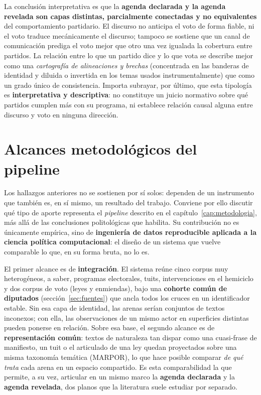 La conclusión interpretativa es que la \textbf{agenda declarada y la agenda
revelada son capas distintas, parcialmente conectadas y no equivalentes} del
comportamiento partidario. El discurso no anticipa el voto de forma fiable, ni el
voto traduce mecánicamente el discurso; tampoco se sostiene que un canal de
comunicación prediga el voto mejor que otro una vez igualada la cobertura entre
partidos. La relación entre lo que un partido dice y lo que vota se describe mejor
como una \emph{cartografía de alineaciones y brechas} (concentrada en las
banderas de identidad y diluida o invertida en los temas usados
instrumentalmente) que como un grado único de consistencia. Importa subrayar,
por último, que esta tipología es \textbf{interpretativa y descriptiva}: no
constituye un juicio normativo sobre qué partidos cumplen más con su programa, ni
establece relación causal alguna entre discurso y voto en ninguna dirección.

\section{Alcances metodológicos del pipeline}
\label{sec:disc-pipeline}

Los hallazgos anteriores no se sostienen por sí solos: dependen de un instrumento
que también es, en sí mismo, un resultado del trabajo. Conviene por ello discutir
qué tipo de aporte representa el \emph{pipeline} descrito en el
capítulo~\ref{cap:metodologia}, más allá de las conclusiones politológicas que
habilita. Su contribución no es únicamente empírica, sino de \textbf{ingeniería de
datos reproducible aplicada a la ciencia política computacional}: el diseño de un
sistema que vuelve comparable lo que, en su forma bruta, no lo es.

El primer alcance es de \textbf{integración}. El sistema reúne cinco corpus muy
heterogéneos, a saber, programas electorales, tuits, intervenciones en el hemiciclo y
dos corpus de voto (leyes y enmiendas), bajo una \textbf{cohorte común de
diputados}
(sección~\ref{sec:fuentes}) que ancla todos los cruces en un identificador
estable. Sin esa capa de identidad, las arenas serían conjuntos de textos
inconexos; con ella, las observaciones de un mismo actor en superficies distintas
pueden ponerse en relación. Sobre esa base, el segundo alcance es de
\textbf{representación común}: textos de naturaleza tan dispar como una
cuasi-frase de manifiesto, un tuit o el articulado de una ley quedan proyectados
sobre una misma taxonomía temática (MARPOR), lo que hace posible comparar
\emph{de qué trata} cada arena en un espacio compartido. Es esta comparabilidad
la que permite, a su vez, articular en un mismo marco la \textbf{agenda declarada}
y la \textbf{agenda revelada}, dos planos que la literatura suele estudiar por
separado.

